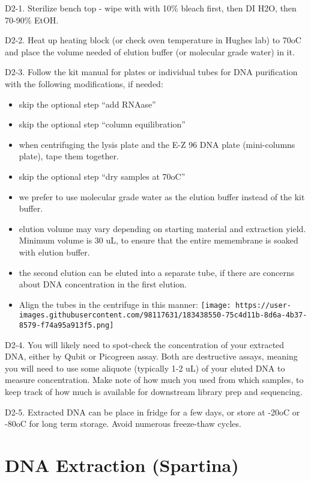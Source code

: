 \documentclass[
  letterpaper,
  DIV=11,
  numbers=noendperiod]{scrreprt}
\begin{document}
D2-1. Sterilize bench top - wipe with with 10\% bleach first, then DI
H2O, then 70-90\% EtOH.

D2-2. Heat up heating block (or check oven temperature in Hughes lab) to
70oC and place the volume needed of elution buffer (or molecular grade
water) in it.

D2-3. Follow the kit manual for plates or individual tubes for DNA
purification with the following modifications, if needed:

\begin{itemize}
\item
  skip the optional step ``add RNAase''
\item
  skip the optional step ``column equilibration''
\item
  when centrifuging the lysis plate and the E-Z 96 DNA plate
  (mini-columns plate), tape them together.
\item
  skip the optional step ``dry samples at 70oC''
\item
  we prefer to use molecular grade water as the elution buffer instead
  of the kit buffer.
\item
  elution volume may vary depending on starting material and extraction
  yield. Minimum volume is 30 uL, to ensure that the entire memembrane
  is soaked with elution buffer.
\item
  the second elution can be eluted into a separate tube, if there are
  concerns about DNA concentration in the first elution.
\item
  Align the tubes in the centrifuge in this manner:
  \texttt{[image: https://user-images.githubusercontent.com/98117631/183438550-75c4d11b-8d6a-4b37-8579-f74a95a913f5.png]}
\end{itemize}

D2-4. You will likely need to spot-check the concentration of your
extracted DNA, either by Qubit or Picogreen assay. Both are destructive
assays, meaning you will need to use some aliquote (typically 1-2 uL) of
your eluted DNA to measure concentration. Make note of how much you used
from which samples, to keep track of how much is available for
downstream library prep and sequencing.

D2-5. Extracted DNA can be place in fridge for a few days, or store at
-20oC or -80oC for long term storage. Avoid numerous freeze-thaw
cycles.\\

\hypertarget{dna-extraction-spartina}{%
\chapter{DNA Extraction (Spartina)}\label{dna-extraction-spartina}}
\end{document}
